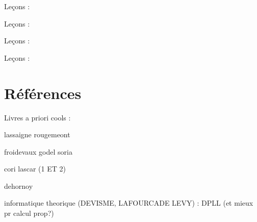 \documentclass[../Agregation.tex]{subfiles}
\begin{document}
Leçons :
\begin{itemize}
\end{itemize}


Leçons :
\begin{itemize}
\end{itemize}

Leçons :
\begin{itemize}
\end{itemize}


Leçons :
\begin{itemize}
\end{itemize}

\chapter{Références}

Livres a priori cools : \textcite{Kozen:1992:DAA:121450}

\printbibliography[segment=1,resetnumbers]

lassaigne rougemeont

froidevaux godel soria

cori lascar (1 ET 2)

dehornoy

informatique theorique (DEVISME, LAFOURCADE LEVY) : DPLL (et mieux pr calcul prop?)
\end{document}
